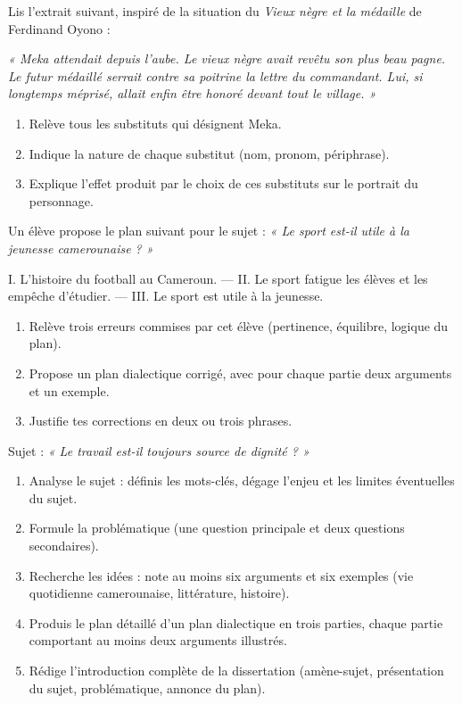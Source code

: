 \documentclass[11pt]{article}
\newcounter{popsec}
\newcounter{popsub}
\newcommand{\courssub}[1]{%
  \stepcounter{popsub}%
  \par\vspace{9pt}\noindent{\popxbold\fontsize{11.5}{13}\selectfont\color{popink}{\color{poporange}\thepopsec.\thepopsub}\hspace{6pt}#1}\par\nopagebreak\vspace{4pt}
}
\begin{document}
\begin{exercice}
Lis l'extrait suivant, inspiré de la situation du \emph{Vieux nègre et la médaille} de Ferdinand Oyono :

\emph{« Meka attendait depuis l'aube. Le vieux nègre avait revêtu son plus beau pagne. Le futur médaillé serrait contre sa poitrine la lettre du commandant. Lui, si longtemps méprisé, allait enfin être honoré devant tout le village. »}

\begin{enumerate}
\item Relève tous les substituts qui désignent Meka.
\item Indique la nature de chaque substitut (nom, pronom, périphrase).
\item Explique l'effet produit par le choix de ces substituts sur le portrait du personnage.
\end{enumerate}
\end{exercice}

\begin{exercice}
Un élève propose le plan suivant pour le sujet : \emph{« Le sport est-il utile à la jeunesse camerounaise ? »}

I. L'histoire du football au Cameroun. — II. Le sport fatigue les élèves et les empêche d'étudier. — III. Le sport est utile à la jeunesse.

\begin{enumerate}
\item Relève trois erreurs commises par cet élève (pertinence, équilibre, logique du plan).
\item Propose un plan dialectique corrigé, avec pour chaque partie deux arguments et un exemple.
\item Justifie tes corrections en deux ou trois phrases.
\end{enumerate}
\end{exercice}

\courssub{Je me prépare au Bac}

\begin{exercice}
Sujet : \emph{« Le travail est-il toujours source de dignité ? »}
\begin{enumerate}
\item Analyse le sujet : définis les mots-clés, dégage l'enjeu et les limites éventuelles du sujet.
\item Formule la problématique (une question principale et deux questions secondaires).
\item Recherche les idées : note au moins six arguments et six exemples (vie quotidienne camerounaise, littérature, histoire).
\item Produis le plan détaillé d'un plan dialectique en trois parties, chaque partie comportant au moins deux arguments illustrés.
\item Rédige l'introduction complète de la dissertation (amène-sujet, présentation du sujet, problématique, annonce du plan).
\end{enumerate}
\end{exercice}
\end{document}
